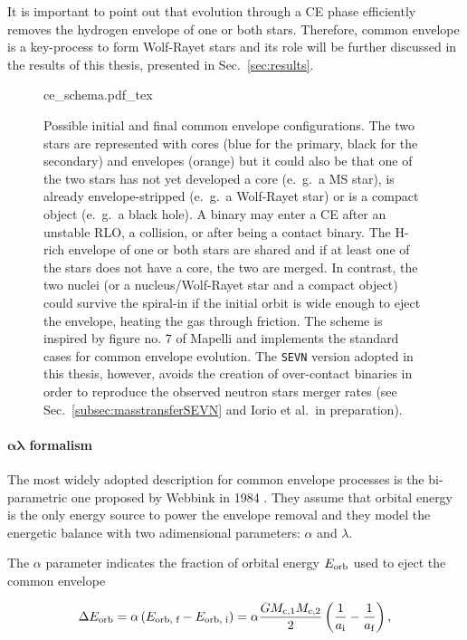 \documentclass[a4paper,titlepage]{book}     	%
\begin{document}
It is important to point out that evolution through a CE phase efficiently removes the hydrogen envelope of one or both stars. Therefore, common envelope is a key-process to form Wolf-Rayet stars and its role will be further discussed in the results of this thesis, presented in Sec.\ \ref{sec:results}.


\begin{figure}
	\centering
	\def\svgwidth{0.9\textwidth}
	{ce_schema.pdf_tex} 
	\caption{Possible initial and final common envelope configurations. The two stars are represented with cores (blue for the primary, black for the secondary) and envelopes (orange) but it could also be that one of the two stars has not yet developed a core (e.\ g.\ a MS star), is already envelope-stripped (e.\ g.\ a Wolf-Rayet star) or is a compact object (e.\ g.\ a black hole). A binary may enter a CE after an unstable RLO, a collision, or after being a contact binary. The H-rich envelope of one or both stars are shared and if at least one of the stars %
	does not have a core, the two are merged. In contrast, the two nuclei (or a nucleus/Wolf-Rayet  star and a compact object) could survive the spiral-in if the initial orbit is wide enough to eject the envelope, heating the gas through friction. The scheme is inspired by figure no. 7 of Mapelli \cite{mapelli} and implements the standard cases for common envelope evolution. The \texttt{SEVN} version adopted in this thesis, however, avoids the creation of over-contact binaries in order to reproduce the observed neutron stars merger rates (see Sec.\ \ref{subsec:masstransferSEVN} and Iorio et al.\ in preparation).}\label{fig:ce_mapelli}
\end{figure}


\paragraph{$\boldsymbol{\alpha \lambda}$ formalism} The most widely adopted description for common envelope processes is the bi-parametric one proposed by Webbink in 1984 \cite{Webbink1984_CE}. They assume that orbital energy is the only energy source to power the envelope removal and they model the energetic balance with two adimensional parameters: $\alpha$ and $\lambda$.

The $\alpha$ parameter indicates the fraction of orbital energy  $E_{\rm orb}$ used to eject the common envelope

\begin{equation}\label{eq:EorbCEalpha}
\Delta E_\textup{orb} = \alpha \left(E_\textup{orb, f} - E_\textup{orb, i}\right) = \alpha \frac{G M_\textup{c,1} M_\textup{c,2}}{2} \left(\frac{1}{a_\textup{i}} - \frac{1}{a_\textup{f}}\right),
\end{equation}
\end{document}
